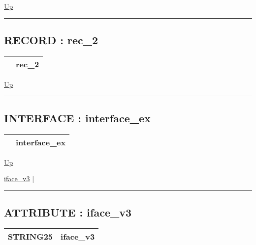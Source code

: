 \hyperlink{ecldoc:example}{Up}

\par


\rule{\textwidth}{0.4pt}
\subsection*{RECORD : rec\_2}
\hypertarget{ecldoc:example.rec_2}{}

{\renewcommand{\arraystretch}{1.5}
\begin{tabularx}{\textwidth}{|>{\raggedright\arraybackslash}l|X|}
\hline
\hspace{0pt} & rec\_2 \\
\hline
\end{tabularx}
}

\hyperlink{ecldoc:example}{Up}

\par


\rule{\textwidth}{0.4pt}
\subsection*{INTERFACE : interface\_ex}
\hypertarget{ecldoc:example.interface_ex}{}

{\renewcommand{\arraystretch}{1.5}
\begin{tabularx}{\textwidth}{|>{\raggedright\arraybackslash}l|X|}
\hline
\hspace{0pt} & interface\_ex \\
\hline
\end{tabularx}
}

\hyperlink{ecldoc:example}{Up}

\par


\hyperlink{ecldoc:example.interface_ex.iface_v3}{iface\_v3}  |

\rule{\textwidth}{0.4pt}

\subsection*{ATTRIBUTE : iface\_v3}
\hypertarget{ecldoc:example.interface_ex.iface_v3}{}

{\renewcommand{\arraystretch}{1.5}
\begin{tabularx}{\textwidth}{|>{\raggedright\arraybackslash}l|X|}
\hline
\hspace{0pt}STRING25 & iface\_v3 \\
\hline
\end{tabularx}
}

